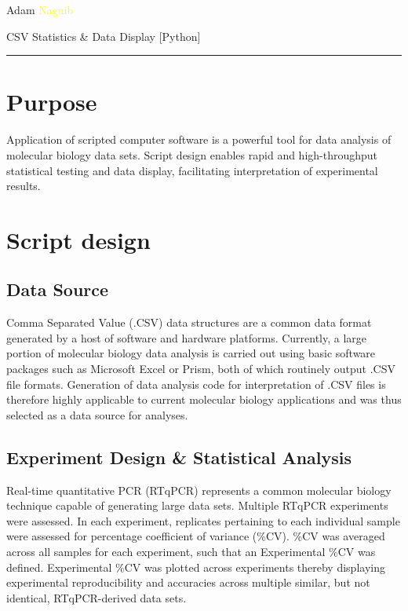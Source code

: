\documentclass{article}
\begin{document}
\begin{minipage}[t]{9cm}
\vspace{-1 mm}
\hspace{-4mm} \noindent \textcolor{black!50}{Adam} \textcolor{yellow}{Naguib}
\end{minipage}

\begin{minipage}[t]{18.5 cm}
\begin{flushright}
\vspace{-8mm}
\huge \textcolor{black!40}{CSV Statistics \& Data Display [Python]}\\
\end{flushright}
\end{minipage}

\vspace{2 mm}
\hspace{-6mm} \textcolor{black!50}{\rule{\linewidth}{2.5pt}}
\vspace{2 mm}

\section{Purpose}
Application of scripted computer software is a powerful tool for data analysis of molecular biology data sets.  Script design enables rapid and high-throughput statistical testing and data display, facilitating interpretation of experimental results.  

\section{Script design}
\subsection{Data Source}
Comma Separated Value (.CSV) data structures are a common data format generated by a host of software and hardware platforms.  Currently, a large portion of molecular biology data analysis is carried out using basic software packages such as Microsoft Excel or Prism, both of which routinely output .CSV file formats.  Generation of data analysis code for interpretation of .CSV files is therefore highly applicable to current molecular biology applications and was thus selected as a data source for analyses. 

\subsection{Experiment Design \& Statistical Analysis}
Real-time quantitative PCR (RTqPCR) represents a common molecular biology technique capable of generating large data sets.  Multiple RTqPCR experiments were assessed.  In each experiment, replicates pertaining to each individual sample were assessed for percentage coefficient of variance (\%CV).  \%CV was averaged across all samples for each experiment, such that an Experimental \%CV was defined.  Experimental \%CV was plotted across experiments thereby displaying experimental reproducibility and accuracies across multiple similar, but not identical, RTqPCR-derived data sets.
\end{document}
